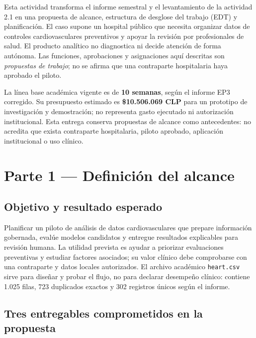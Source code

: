 \documentclass[12pt,a4paper]{article}
\begin{document}
Esta actividad transforma el informe semestral y el levantamiento de la actividad 2.1 en una propuesta de alcance, estructura de desglose del trabajo (EDT) y planificación. El caso supone un hospital público que necesita organizar datos de controles cardiovasculares preventivos y apoyar la revisión por profesionales de salud. El producto analítico no diagnostica ni decide atención de forma autónoma. Las funciones, aprobaciones y asignaciones aquí descritas son \emph{propuestas de trabajo}; no se afirma que una contraparte hospitalaria haya aprobado el piloto.

La línea base académica vigente es de \textbf{10 semanas}, según el informe EP3 corregido. Su presupuesto estimado es \textbf{\$10.506.069 CLP} para un prototipo de investigación y demostración; no representa gasto ejecutado ni autorización institucional. Esta entrega conserva propuestas de alcance como antecedentes: no acredita que exista contraparte hospitalaria, piloto aprobado, aplicación institucional o uso clínico.

\section{Parte 1 --- Definición del alcance}

\subsection{Objetivo y resultado esperado}

Planificar un piloto de análisis de datos cardiovasculares que prepare información gobernada, evalúe modelos candidatos y entregue resultados explicables para revisión humana. La utilidad prevista es ayudar a priorizar evaluaciones preventivas y estudiar factores asociados; su valor clínico debe comprobarse con una contraparte y datos locales autorizados. El archivo académico \texttt{heart.csv} sirve para diseñar y probar el flujo, no para declarar desempeño clínico: contiene 1.025 filas, 723 duplicados exactos y 302 registros únicos según el informe.

\subsection{Tres entregables comprometidos en la propuesta}
\end{document}
